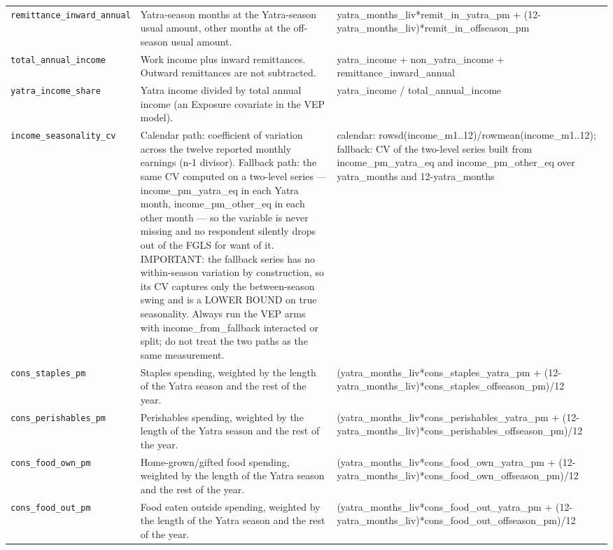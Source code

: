 \documentclass[10pt]{article}
\begin{document}
{\begin{longtable}{p{3.3cm}p{7.6cm}p{5.7cm}}
\texttt{remittance\_inward\_annual} & Yatra-season months at the Yatra-season usual amount, other months at the off-season usual amount. & yatra\_months\_liv*remit\_in\_yatra\_pm + (12-yatra\_months\_liv)*remit\_in\_offseason\_pm \\
\texttt{total\_annual\_income} & Work income plus inward remittances. Outward remittances are not subtracted. & yatra\_income + non\_yatra\_income + remittance\_inward\_annual \\
\texttt{yatra\_income\_share} & Yatra income divided by total annual income (an Exposure covariate in the VEP model). & yatra\_income / total\_annual\_income \\
\texttt{income\_seasonality\_cv} & Calendar path: coefficient of variation across the twelve reported monthly earnings (n-1 divisor). Fallback path: the same CV computed on a two-level series — income\_pm\_yatra\_eq in each Yatra month, income\_pm\_other\_eq in each other month — so the variable is never missing and no respondent silently drops out of the FGLS for want of it. IMPORTANT: the fallback series has no within-season variation by construction, so its CV captures only the between-season swing and is a LOWER BOUND on true seasonality. Always run the VEP arms with income\_from\_fallback interacted or split; do not treat the two paths as the same measurement. & calendar: rowsd(income\_m1..12)/rowmean(income\_m1..12); fallback: CV of the two-level series built from income\_pm\_yatra\_eq and income\_pm\_other\_eq over yatra\_months and 12-yatra\_months \\
\texttt{cons\_staples\_pm} & Staples spending, weighted by the length of the Yatra season and the rest of the year. & (yatra\_months\_liv*cons\_staples\_yatra\_pm + (12-yatra\_months\_liv)*cons\_staples\_offseason\_pm)/12 \\
\texttt{cons\_perishables\_pm} & Perishables spending, weighted by the length of the Yatra season and the rest of the year. & (yatra\_months\_liv*cons\_perishables\_yatra\_pm + (12-yatra\_months\_liv)*cons\_perishables\_offseason\_pm)/12 \\
\texttt{cons\_food\_own\_pm} & Home-grown/gifted food spending, weighted by the length of the Yatra season and the rest of the year. & (yatra\_months\_liv*cons\_food\_own\_yatra\_pm + (12-yatra\_months\_liv)*cons\_food\_own\_offseason\_pm)/12 \\
\texttt{cons\_food\_out\_pm} & Food eaten outside spending, weighted by the length of the Yatra season and the rest of the year. & (yatra\_months\_liv*cons\_food\_out\_yatra\_pm + (12-yatra\_months\_liv)*cons\_food\_out\_offseason\_pm)/12 \\

\end{longtable}}
\end{document}
